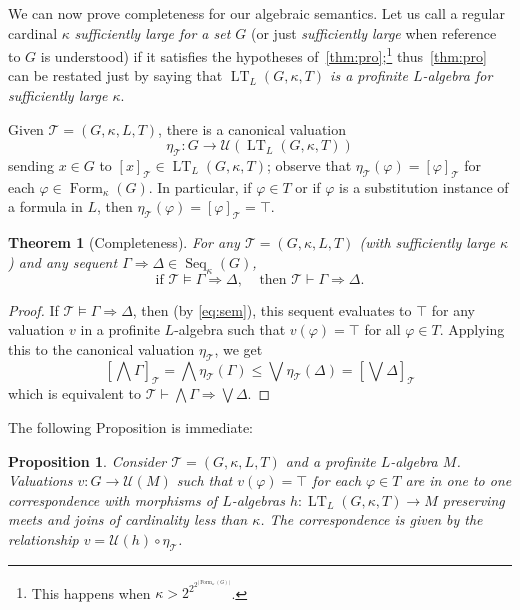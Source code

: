\documentclass{article}
\newtheorem{thm}{Theorem}
\newtheorem{prop}{Proposition}
\theoremstyle{definition}
\DeclareMathOperator{\LT}{LT}
\DeclareMathOperator{\Formulas}{Form}
\DeclareMathOperator{\Seq}{Seq}
\begin{document}
We can now prove completeness for our algebraic semantics. Let us call a regular cardinal $\kappa$ \emph{sufficiently large for a set $G$} (or just \emph{sufficiently large} when reference to $G$ is understood) if it satisfies the hypotheses of~\cref{thm:pro};\footnote{ 
This happens when $\kappa > 2^{2^{2^{|\Formulas_\omega(G)|}}}$.
}
thus~\cref{thm:pro} can be restated just by saying that \emph{$\LT_L(G,\kappa,T)$ is a profinite $L$-algebra for sufficiently large $\kappa$}.

Given $\mathcal{T} = (G,\kappa,L,T)$, 
there is a canonical valuation 
$$\eta_\mathcal{T} \colon G \longrightarrow \mathcal{U}(\LT_L(G,\kappa,T))$$ 
sending $x \in G$ to $[x]_\mathcal{T} \in \LT_L(G,\kappa,T)$; observe that $\eta_\mathcal{T}(\varphi) = [\varphi]_\mathcal{T}$ for each $\varphi \in \Formulas_\kappa(G)$. In particular, if $\varphi \in T$ or if $\varphi$ is a substitution instance of a formula in $L$, then
$\eta_\mathcal{T}(\varphi) = [\varphi]_\mathcal{T} = %
\top.$

\begin{thm}[Completeness]\label{thm:completeness}
For any $\mathcal{T} = (G,\kappa,L,T)$ 
(with sufficiently large $\kappa$) and any sequent $\Gamma \Rightarrow \Delta \in \Seq_\kappa(G)$,
$$\text{if } \mathcal{T} \vDash \Gamma \Rightarrow \Delta, ~~~~~\text{then } \mathcal{T} \vdash \Gamma \Rightarrow \Delta.$$
\end{thm}
\begin{proof}
If $\mathcal{T} \vDash \Gamma \Rightarrow \Delta$, then (by \cref{eq:sem}), this sequent evaluates to $\top$ for any valuation $v$  in a profinite $L$-algebra such that $v(\varphi)=\top$ for all $\varphi \in T$. Applying this to the canonical valuation 
 $\eta_\mathcal{T}$, we get 
$$\left[\bigwedge \Gamma \right]_\mathcal{T} = \bigwedge \eta_\mathcal{T} \left(\Gamma\right) \leq \bigvee \eta_\mathcal{T} \left(\Delta\right) = \left[\bigvee \Delta \right]_\mathcal{T}$$
which
is equivalent to $\mathcal{T} \vdash \bigwedge \Gamma \Rightarrow \bigvee \Delta$. 
\end{proof}

The following Proposition is immediate:

\begin{prop}\label{prop:univ}
Consider $\mathcal{T} = (G,\kappa,L,T)$ and  a profinite $L$-algebra $M$. Valuations $v \colon G \longrightarrow \mathcal{U}(M)$ such that $v(\varphi) = \top$ for each $\varphi \in T$ are in one to one correspondence with morphisms of $L$-algebras $h : \LT_L(G,\kappa,T) \longrightarrow M$ preserving meets and joins of cardinality less than $\kappa$.
The correspondence is given by the relationship $v=\mathcal{U}(h) \circ \eta_\mathcal{T}$.
\end{prop}
\end{document}
